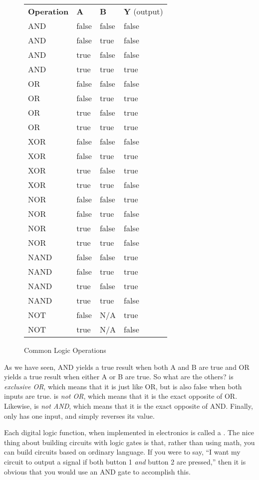 \begin{figure}
\caption{Common Logic Operations}
\centering
\label{figTruthTable}
\begin{tabular}{l | l | l| | l}
\textbf{Operation} & \textbf{A} & \textbf{B} & \textbf{Y} (output) \\
AND & false & false & false \\
AND & false & true & false \\
AND & true & false & false \\
AND & true & true & true \\
OR & false & false & false \\
OR & false & true & true \\
OR & true & false & true \\
OR & true & true & true \\
XOR & false & false & false \\
XOR & false & true & true \\
XOR & true & false & true \\
XOR & true & true & false \\
NOR & false & false & true \\
NOR & false & true & false \\
NOR & true & false & false \\
NOR & true & true & false \\
NAND & false & false & true \\
NAND & false & true & true \\
NAND & true & false & true \\
NAND & true & true & false \\
NOT & false & N/A & true \\
NOT & true & N/A & false \\
\end{tabular}
\end{figure}

As we have seen, AND yields a true result when both A and B are true and OR yields a true result when either A or B are true.
So what are the others?
 is \emph{exclusive OR}, which means that it is just like OR, but is also false when both inputs are true.
 is \emph{not OR}, which means that it is the exact opposite of OR.
Likewise,  is \emph{not AND}, which means that it is the exact opposite of AND.
Finally,  only has one input, and simply reverses its value.

Each digital logic function, when implemented in electronics is called a .
The nice thing about building circuits with logic gates is that, rather than using math, you can build circuits based on ordinary language.
If you were to say, ``I want my circuit to output a signal if both button 1 \emph{and} button 2 are pressed,'' then it is obvious that you would use an AND gate to accomplish this.

